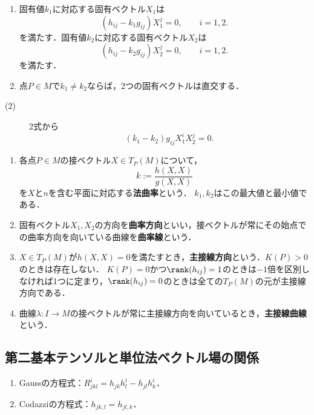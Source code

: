 \documentclass[uplatex,dvipdfmx]{jsreport}
\begin{document}
\begin{proposition}\mbox{}
    \begin{enumerate}
        \item 固有値$k_1$に対応する固有ベクトル$X_1$は
        \[(h_{ij}-k_1g_{ij})X^j_1=0,\qquad i=1,2.\]
        を満たす．固有値$k_2$に対応する固有ベクトル$X_2$は
        \[(h_{ij}-k_2g_{ij})X_2^j=0,\qquad i=1,2.\]
        を満たす．
        \item 点$P\in M$で$k_1\ne k_2$ならば，2つの固有ベクトルは直交する．
    \end{enumerate}
\end{proposition}
\begin{Proof}\mbox{}
    \begin{description}
        \item[(2)] 2式から
        \[(k_1-k_2)g_{ij}X^i_1X^j_2=0.\]
    \end{description}
\end{Proof}

\begin{definition}\mbox{}
    \begin{enumerate}
        \item 各点$P\in M$の接ベクトル$X\in T_P(M)$について，
        \[k:=\frac{h(X,X)}{g(X,X)}\]
        を$X$と$n$を含む平面に対応する\textbf{法曲率}という．
        $k_1,k_2$はこの最大値と最小値である．
        \item 固有ベクトル$X_1,X_2$の方向を\textbf{曲率方向}といい，接ベクトルが常にその始点での曲率方向を向いている曲線を\textbf{曲率線}という．
        \item $X\in T_P(M)$が$h(X,X)=0$を満たすとき，\textbf{主接線方向}という．$K(P)>0$のときは存在しない．
        $K(P)=0$かつ$\rank(h_{ij})=1$のときは$-1$倍を区別しなければ1つに定まり，$\rank(h_{ij})=0$のときは全ての$T_P(M)$の元が主接線方向である．
        \item 曲線$\lambda:I\to M$の接ベクトルが常に主接線方向を向いているとき，\textbf{主接線曲線}という．
    \end{enumerate}
\end{definition}

\subsection{第二基本テンソルと単位法ベクトル場の関係}

\begin{proposition}\mbox{}
    \begin{enumerate}
        \item Gaussの方程式：$R^i_{jkl}=h_{jk}h_l^i-h_{jl}h^i_k$．
        \item Codazziの方程式：$h_{jk,l}=h_{jl,k}$．
    \end{enumerate}
\end{proposition}
\end{document}
